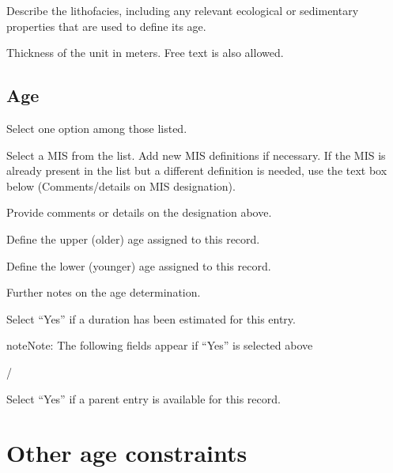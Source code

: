 \documentclass[letterpaper,10pt,english]{sphinxmanual}
\begin{document}
 \sphinxhyphen{} Describe the lithofacies, including any relevant ecological or sedimentary properties that are used to define its age.

 \sphinxhyphen{} Thickness of the unit in meters. Free text is also allowed.


\section{Age}
\label{\detokenize{Chronostratigraphy:age}}
 \sphinxhyphen{} Select one option among those listed.

 \sphinxhyphen{} Select a MIS from the list. Add new MIS definitions if necessary. If the MIS is already present in the list but a different definition is needed, use the text box below (Comments/details on MIS designation).

 \sphinxhyphen{} Provide comments or details on the designation above.

 \sphinxhyphen{} Define the upper (older) age assigned to this record.

 \sphinxhyphen{} Define the lower (younger) age assigned to this record.

 \sphinxhyphen{} Further notes on the age determination.

 \sphinxhyphen{} Select “Yes” if a duration has been estimated for this entry.

\begin{sphinxadmonition}{note}{Note:}
The following fields appear if “Yes” is selected above
\end{sphinxadmonition}

 / 

 \sphinxhyphen{} Select “Yes” if a parent entry is available for this record.



\chapter{Other age constraints}
\label{\detokenize{Other_age:other-age-constraints}}\label{\detokenize{Other_age::doc}}
\end{document}

